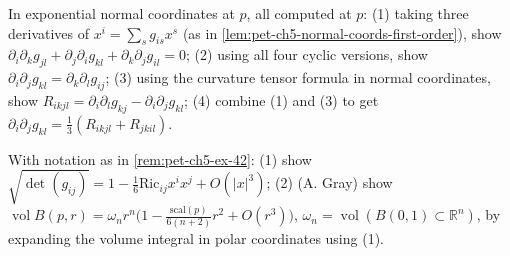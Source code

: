 \begin{remark}
  \label{rem:pet-ch5-ex-42}
  In exponential normal coordinates at $p$, all computed at $p$: (1) taking three
  derivatives of $x^i=\sum_sg_{is}x^s$ (as in
  \cref{lem:pet-ch5-normal-coords-first-order}), show
  $\partial_i\partial_kg_{jl}+\partial_j\partial_ig_{kl}+\partial_k\partial_jg_{il}=0$;
  (2) using all four cyclic versions, show
  $\partial_i\partial_jg_{kl}=\partial_k\partial_lg_{ij}$; (3) using the curvature
  tensor formula in normal coordinates, show
  $R_{ikjl}=\partial_i\partial_lg_{kj}-\partial_i\partial_jg_{kl}$; (4) combine (1)
  and (3) to get $\partial_i\partial_jg_{kl}=\tfrac13(R_{ikjl}+R_{jkil})$.
\end{remark}

\begin{remark}
  \label{rem:pet-ch5-ex-43}
  With notation as in \cref{rem:pet-ch5-ex-42}: (1) show
  $\sqrt{\det(g_{ij})}=1-\tfrac16\mathrm{Ric}_{ij}x^ix^j+O(|x|^3)$; (2) (A. Gray)
  show $\operatorname{vol}B(p,r)=\omega_nr^n\big(1-\tfrac{\mathrm{scal}(p)}{6(n+2)}r^2
  +O(r^3)\big)$, $\omega_n=\operatorname{vol}(B(0,1)\subset\mathbb R^n)$, by
  expanding the volume integral in polar coordinates using (1).
\end{remark}
